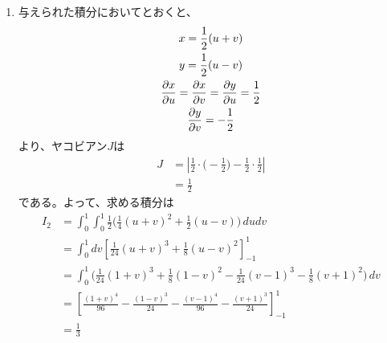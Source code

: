 \begin{ans*}
\begin{enumerate}[label=(\alph*)]
    \item 与えられた積分においてとおくと、
    \begin{gather}
      x = \frac{1}{2}(u+v) \\
      y = \frac{1}{2}(u-v) \\
      \frac{\partial x}{\partial u} = \frac{\partial x}{\partial v} = \frac{\partial y}{\partial u} = \frac{1}{2} \\
      \frac{\partial y}{\partial v} = -\frac{1}{2}
    \end{gather}
    より、ヤコビアン$J$は
    \begin{align}
      J
      &= \left|\frac{1}{2}\cdot\biggl(-\frac{1}{2}\biggr) - \frac{1}{2}\cdot\frac{1}{2}\right| \\
      &= \frac{1}{2}
    \end{align}
    である。よって、求める積分は
    \begin{align}
      I_2
      &= \int_{0}^{1}\int_{0}^{1}\frac{1}{2} \biggl(
        \frac{1}{4}(u+v)^2 + \frac{1}{2}(u-v)
      \biggr)\,dudv\\
      &= \int_{0}^{1}dv\left[\frac{1}{24}(u+v)^3 + \frac{1}{8}(u-v)^2\right]_{-1}^{1} \\
      &= \int_{0}^{1}
        \biggl(\frac{1}{24}(1+v)^3 + \frac{1}{8}(1-v)^2 - \frac{1}{24}(v-1)^3 - \frac{1}{8}(v+1)^2\biggr)
      \,dv \\
      &= \left[\frac{(1+v)^4}{96} - \frac{(1-v)^3}{24} - \frac{(v-1)^4}{96} - \frac{(v+1)^3}{24}\right]_{-1}^{1} \\
      &= \frac{1}{3}
    \end{align}
  \end{enumerate}
\end{ans*}


\newpage
